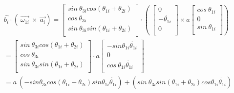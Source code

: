                 \begin{align*}
                 &\widehat{b_{i}} \cdot  \left( ~\overrightarrow{ \omega _{1i}}~\times~\overrightarrow{a_{i}} \right)= \left[ \begin{matrix}
                sin~ \theta _{3i}cos⁡ \left(  \theta _{1i}+ \theta _{2i} \right) \\
                cos~ \theta _{3i}\\
                sin~ \theta _{3i}sin \left(  \theta _{1i}+ \theta _{2i} \right) \\
                \end{matrix}
                 \right]  \cdot   \left( ~ \left[ \begin{matrix}
                0\\
                -\dot{ \theta _{1i}}\\
                0\\
                \end{matrix}
                 \right] \times a \left[ \begin{matrix}
                cos~ \theta _{1i}\\
                0\\
                sin~ \theta _{1i}\\
                \end{matrix}
                 \right]  \right) \\
                &= \left[ \begin{matrix}
                sin~ \theta _{3i}cos⁡ \left(  \theta _{1i}+ \theta _{2i} \right) \\
                cos~ \theta _{3i}\\
                sin~ \theta _{3i}sin \left(  \theta _{1i}+ \theta _{2i} \right) \\
                \end{matrix}
                 \right]  \cdot  a \left[ \begin{matrix}
                -sin  \theta _{1i}\dot{ \theta _{1i}}\\
                0\\
                cos~ \theta _{1i}\dot{ \theta _{1i}}\\
                \end{matrix}
                 \right] \\
                 &=a~  \left( -sin  \theta _{3i}cos⁡ \left(  \theta _{1i}+ \theta _{2i} \right) sin  \theta _{1i}\dot{ \theta _{1i}} \right) + \left( sin~ \theta _{3i}sin \left(  \theta _{1i}+ \theta _{2i} \right) cos  \theta _{1i}\dot{ \theta _{1i}} \right)  \\

\end{align*}
